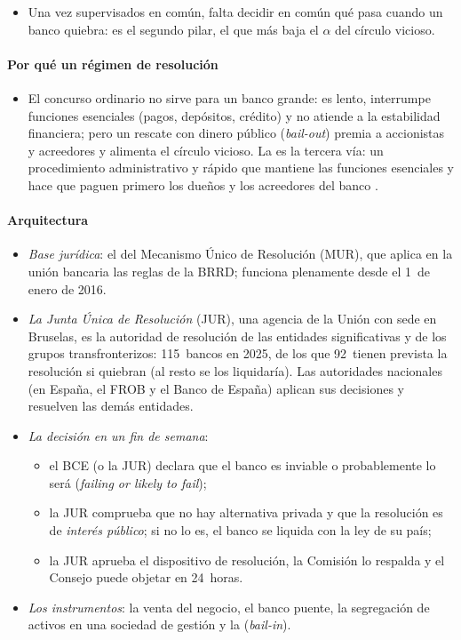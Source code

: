 \documentclass[11pt]{article}
\begin{document}
\begin{itemize}
\item Una vez supervisados en común, falta decidir en común qué pasa cuando un banco quiebra: es el segundo pilar, el que más baja el $\alpha$ del círculo vicioso.
\end{itemize}

\paragraph{Por qué un régimen de resolución}

\begin{itemize}
\item El concurso ordinario no sirve para un banco grande: es lento, interrumpe funciones esenciales (pagos, depósitos, crédito) y no atiende a la estabilidad financiera; pero un rescate con dinero público (\emph{bail-out}) premia a accionistas y acreedores y alimenta el círculo vicioso. La  es la tercera vía: un procedimiento administrativo y rápido que mantiene las funciones esenciales y hace que paguen primero los dueños y los acreedores del banco .
\end{itemize}

\paragraph{Arquitectura}

\begin{itemize}
\item \emph{Base jurídica}: el  del Mecanismo Único de Resolución (MUR), que aplica en la unión bancaria las reglas de la BRRD\nocite{RegUE2014MUR}; funciona plenamente desde el 1~de enero de 2016.
\item \emph{La Junta Única de Resolución} (JUR), una agencia de la Unión con sede en Bruselas, es la autoridad de resolución de las entidades significativas y de los grupos transfronterizos: 115~bancos en 2025, de los que 92~tienen prevista la resolución si quiebran (al resto se los liquidaría)\nocite{SRB2026InformeAnual}. Las autoridades nacionales (en España, el FROB y el Banco de España) aplican sus decisiones y resuelven las demás entidades.
\item \emph{La decisión en un fin de semana}:
  \begin{itemize}
  \item el BCE (o la JUR) declara que el banco es inviable o probablemente lo será (\emph{failing or likely to fail});
  \item la JUR comprueba que no hay alternativa privada y que la resolución es de \emph{interés público}; si no lo es, el banco se liquida con la ley de su país;
  \item la JUR aprueba el dispositivo de resolución, la Comisión lo respalda y el Consejo puede objetar en 24~horas.
  \end{itemize}
\item \emph{Los instrumentos}: la venta del negocio, el banco puente, la segregación de activos en una sociedad de gestión y la  (\emph{bail-in}).
\end{itemize}
\end{document}
